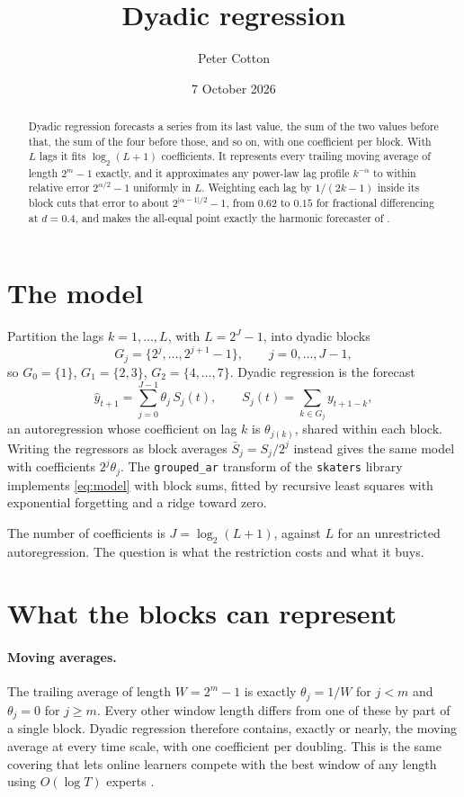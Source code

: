 \documentclass[11pt]{article}
\title{Dyadic regression}
\author{Peter Cotton}
\date{7 October 2026}
\begin{document}
\maketitle

\begin{abstract}
Dyadic regression forecasts a series from its last value, the sum of the two values before that,
the sum of the four before those, and so on, with one coefficient per block. With $L$ lags it fits
$\log_2(L+1)$ coefficients. It represents every trailing moving average of length $2^m-1$ exactly,
and it approximates any power-law lag profile $k^{-\alpha}$ to within relative error $2^{\alpha/2}-1$
uniformly in $L$. Weighting each lag by $1/(2k-1)$ inside its block cuts that error to about
$2^{|\alpha-1|/2}-1$, from $0.62$ to $0.15$ for fractional differencing at $d=0.4$, and makes the
all-equal point exactly the harmonic forecaster of \citet{fishelson2026}.
\end{abstract}

\section{The model}

Partition the lags $k=1,\dots,L$, with $L=2^J-1$, into dyadic blocks
\[
G_j=\{2^j,\dots,2^{j+1}-1\},\qquad j=0,\dots,J-1,
\]
so $G_0=\{1\}$, $G_1=\{2,3\}$, $G_2=\{4,\dots,7\}$. Dyadic regression is the forecast
\begin{equation}\label{eq:model}
\hat y_{t+1}=\sum_{j=0}^{J-1}\theta_j\,S_j(t),\qquad S_j(t)=\sum_{k\in G_j}y_{t+1-k},
\end{equation}
an autoregression whose coefficient on lag $k$ is $\theta_{j(k)}$, shared within each block. Writing
the regressors as block averages $\bar S_j=S_j/2^j$ instead gives the same model with coefficients
$2^j\theta_j$. The \texttt{grouped\_ar} transform of the \texttt{skaters} library implements
\eqref{eq:model} with block sums, fitted by recursive least squares with exponential forgetting and
a ridge toward zero.

The number of coefficients is $J=\log_2(L+1)$, against $L$ for an unrestricted autoregression. The
question is what the restriction costs and what it buys.

\section{What the blocks can represent}

\paragraph{Moving averages.} The trailing average of length $W=2^m-1$ is exactly
$\theta_j=1/W$ for $j<m$ and $\theta_j=0$ for $j\ge m$. Every other window length differs from one of
these by part of a single block. Dyadic regression therefore contains, exactly or nearly, the moving
average at every time scale, with one coefficient per doubling. This is the same covering that lets
online learners compete with the best window of any length using $O(\log T)$ experts
\citep{daniely2015}.
\end{document}
